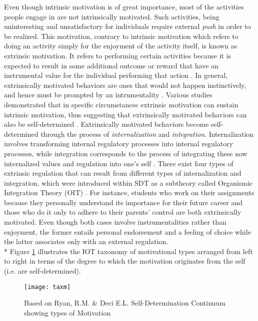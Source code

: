 Even though intrinsic motivation is of great importance, most of the activities people engage in are not intrinsically motivated. Such activities, being uninteresting and unsatisfactory for individuals  require external \textit{push} in order to be realized. This motivation, contrary to intrinsic motivation which refers to doing an activity simply for the enjoyment of the activity itself, is known as extrinsic motivation. It refers to performing certain activities because it is expected to result in some additional outcome or reward that have an instrumental value for the individual performing that action \cite{ryan2000self}. In general, extrinsically motivated behaviors are ones that would not happen instinctively, and hence must be prompted by an intrumentality \cite{deci1994promoting}. Various studies demonstrated that in specific circumstances extrinsic motivation can sustain intrinsic motivation, thus suggesting that extrinsically motivated behaviors can also be self-determined \cite{deci1994promoting}. Extrinsically motivated behaviors become self-determined through the process of \textit{internalization} and \textit{integration}. Internalization involves transforming internal regulatory processes into internal regulatory processes, while integration corresponds to the process of integrating these now internalized values and regulation into one's self \cite{deci1994promoting}. There exist four types of extrinsic regulation that can result from different types of internalization and integration, which were introduced within SDT as a subtheory called Organismic Integration Theory (OIT) \cite{ryan2000intrinsic, ryan2000self, deci1994promoting}. For instance, students who work on their assignments because they personally understand its importance for their future career and those who do it only to adhere to their parents' control are both extrinsically motivated. Even though both cases involve instrumentalities rather than enjoyment, the former entails personal endorsement and a feeling of choice while the latter associates only with an external regulation.\\*
Figure \ref{fig:tax} illustrates the IOT taxonomy of motivational types arranged from left to right in terms of the degree to which the motivation originates from the self (i.e. are self-determined). 
\begin{figure}[h]
    \centering
    \texttt{[image: taxm]}
    \caption{Based on Ryan, R.M. \& Deci E.L. Self-Determination Continuum showing types of Motivation}
    \label{fig:tax}
\end{figure}
